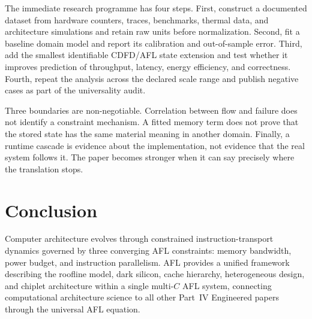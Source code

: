 \documentclass[11pt]{article}
\begin{document}
The immediate research programme has four steps. First, construct a documented
dataset from hardware counters, traces, benchmarks, thermal data, and architecture simulations and retain raw units before normalization.
Second, fit a baseline domain model and report its calibration and out-of-sample
error. Third, add the smallest identifiable CDFD/AFL state extension and test
whether it improves prediction of throughput, latency, energy efficiency, and correctness. Fourth, repeat the
analysis across the declared scale range and publish negative cases as part of
the universality audit.

Three boundaries are non-negotiable. Correlation between flow and failure does
not identify a constraint mechanism. A fitted memory term does not prove that
the stored state has the same material meaning in another domain. Finally, a
runtime cascade is evidence about the implementation, not evidence that the
real system follows it. The paper becomes stronger when it can say precisely
where the translation stops.



\section{Conclusion}

Computer architecture evolves through constrained instruction-transport dynamics governed by
three converging AFL constraints: memory bandwidth, power budget, and instruction parallelism.
AFL provides a unified framework describing the roofline model, dark silicon, cache hierarchy,
heterogeneous design, and chiplet architecture within a single multi-$C$ AFL system,
connecting computational architecture science to all other Part~IV Engineered papers through
the universal AFL equation.



\end{document}
